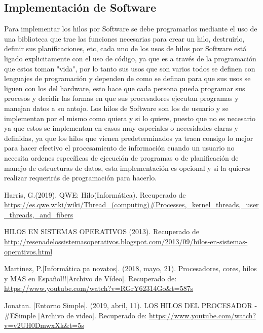 \documentclass[letterpaper]{article}
\begin{document}
\subsection{Implementación de Software}
Para implementar los hilos por Software se debe programarlos mediante el uso de una biblioteca que trae las funciones necesarias para crear un hilo, destruirlo, definir sus planificaciones, etc, cada uno de los usos de hilos por Software está ligado explicitamente con el uso de código, ya que es a través de la programación que estos toman "vida", por lo tanto sus usos que son varios todos se definen con lenguajes de programación y dependen de como se definan para que sus usos se liguen con los del hardware, esto hace que cada persona pueda programar sus procesos y decidir las formas en que sus procesadores ejecutan programas y manejan datos a su antojo. Los hilos de Software son los de usuario y se implementan por el mismo como quiera y si lo quiere, puesto que no es necesario ya que estos se implementan en casos muy especiales o necesidades claras y definidas, ya que los hilos que vienen predeterminados ya traen consigo lo mejor para hacer efectivo el procesamiento de información cuando un usuario no necesita ordenes específicas de ejecución de programas o de planificación de manejo de estructuras de datos, esta implementación es opcional y si la quieres realizar requerirás de programación para hacerlo.




\begin{thebibliography}{9}


 Harris, G.(2019). QWE: Hilo(Informática). Recuperado de \url{https://es.qwe.wiki/wiki/Thread_(computing)#Processes,_kernel_threads,_user_threads,_and_fibers}

 HILOS EN SISTEMAS OPERATIVOS (2013). Recuperado de \url{http://resenadelossistemasoperativos.blogspot.com/2013/09/hilos-en-sistemas-operativos.html}

 Martinez, P.[Informática pa novatos]. (2018, mayo, 21). Procesadores, cores, hilos y MAS en Español!![Archivo de Vídeo]. Recuperado de: \url{https://www.youtube.com/watch?v=RGrY62314Go&t=587s}

 Jonatan. [Entorno Simple]. (2019, abril, 11). LOS HILOS DEL PROCESADOR - #ESimple [Archivo de video]. Recuperado de: \url{https://www.youtube.com/watch?v=v2UH0DmwxXk&t=5s}

\end{thebibliography}
\end{document}
